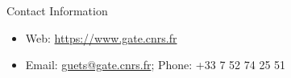 \documentclass[final]{beamer}
\newlength{\onecolwid}
\begin{document}
\begin{frame}[t]
\begin{columns}[t]
\begin{column}{\onecolwid}


\begin{alertblock}{Contact Information}
\begin{itemize}
\item \small Web: \href{https://www.gate.cnrs.fr/spip.php?article1124&lang=fr}{https://www.gate.cnrs.fr}
\item \small Email: \href{mailto: guets@gate.cnrs.fr}{ guets@gate.cnrs.fr}; \small Phone: +33 7 52 74 25 51
\end{itemize}
\end{alertblock}


\end{column}
\end{columns}
\end{frame}
\end{document}

